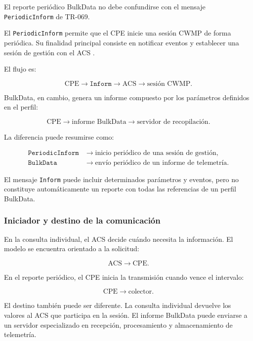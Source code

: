El reporte periódico BulkData no debe confundirse con el mensaje
\texttt{PeriodicInform} de TR-069.

El \texttt{PeriodicInform} permite que el CPE inicie una sesión CWMP de
forma periódica. Su finalidad principal consiste en notificar eventos y
establecer una sesión de gestión con el ACS \cite{bbf_tr069}.

El flujo es:

\[
    \text{CPE}
    \longrightarrow
    \texttt{Inform}
    \longrightarrow
    \text{ACS}
    \longrightarrow
    \text{sesión CWMP}.
\]

BulkData, en cambio, genera un informe compuesto por los parámetros
definidos en el perfil:

\[
    \text{CPE}
    \longrightarrow
    \text{informe BulkData}
    \longrightarrow
    \text{servidor de recopilación}.
\]

La diferencia puede resumirse como:

\[
\begin{aligned}
    \texttt{PeriodicInform}
    &\longrightarrow
    \text{inicio periódico de una sesión de gestión},\\
    \texttt{BulkData}
    &\longrightarrow
    \text{envío periódico de un informe de telemetría}.
\end{aligned}
\]

El mensaje \texttt{Inform} puede incluir determinados parámetros y
eventos, pero no constituye automáticamente un reporte con todas las
referencias de un perfil BulkData.


\subsubsection*{Iniciador y destino de la comunicación}

En la consulta individual, el ACS decide cuándo necesita la información.
El modelo se encuentra orientado a la solicitud:

\[
    \text{ACS}
    \longrightarrow
    \text{CPE}.
\]

En el reporte periódico, el CPE inicia la transmisión cuando vence el
intervalo:

\[
    \text{CPE}
    \longrightarrow
    \text{colector}.
\]

El destino también puede ser diferente. La consulta individual devuelve
los valores al ACS que participa en la sesión. El informe BulkData puede
enviarse a un servidor especializado en recepción, procesamiento y
almacenamiento de telemetría.

